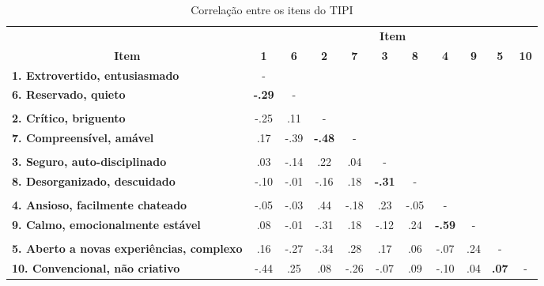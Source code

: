 \begin{sidewaystable}[ph!]
\footnotesize
\caption{\small Correlação entre os itens do TIPI}
\addtolength{\tabcolsep}{1pt}
\centering

    \begin{tabular}{lcccccccccc}
    \toprule
          & \multicolumn{10}{c}{\textbf{Item}} \\
    \multicolumn{1}{c}{\textbf{Item}} & \textbf{1} & \textbf{6} & \textbf{2} & \textbf{7} & \textbf{3} & \textbf{8} & \textbf{4} & \textbf{9} & \textbf{5} & \textbf{10} \\
		\midrule
    \multicolumn{1}{l}{\textbf{1. Extrovertido, entusiasmado}} 						& -     &       &       &       &       &       &       &       &       &  \\
    \multicolumn{1}{l}{\textbf{6. Reservado, quieto}} 										& \textbf{-.29}	& -     &       &       &       &       &       &       &       &  \\
    \textbf{} & & & & & & & & & &  \\
    \multicolumn{1}{l}{\textbf{2. Crítico, briguento}} 										& -.25  & .11   & -     &       &       &       &       &       &       &  \\
    \multicolumn{1}{l}{\textbf{7. Compreensível, amável}} 								& .17   & -.39  & \textbf{-.48} & -     &       &       &       &       &       &  \\
    \textbf{} & & & & & & & & & &  \\
    \multicolumn{1}{l}{\textbf{3. Seguro, auto-disciplinado}} 						& .03   & -.14  & .22   & .04   & -     &       &       &       &       &  \\
    \multicolumn{1}{l}{\textbf{8. Desorganizado, descuidado}} 						& -.10  & -.01  & -.16  & .18   & \textbf{-.31} & -     &       &       &       &  \\
    \textbf{} & & & & & & & & & &  \\
    \multicolumn{1}{l}{\textbf{4. Ansioso, facilmente chateado}} 					& -.05  & -.03  & .44   & -.18  & .23   & -.05  & -     &       &       &  \\
    \multicolumn{1}{l}{\textbf{9. Calmo, emocionalmente estável}} 				& .08   & -.01  & -.31  & .18   & -.12  & .24   & \textbf{-.59} & -     &       &  \\
    \textbf{} & & & & & & & & & &  \\
    \multicolumn{1}{l}{\textbf{5. Aberto a novas experiências, complexo}} & .16   & -.27  & -.34  & .28   & .17   & .06   & -.07  & .24   & -     &  \\
    \multicolumn{1}{l}{\textbf{10. Convencional, não criativo}} 					& -.44  & .25   & .08   & -.26  & -.07  & .09   & -.10  & .04   & \textbf{.07} & - \\
    

\end{tabular}
\end{sidewaystable}
